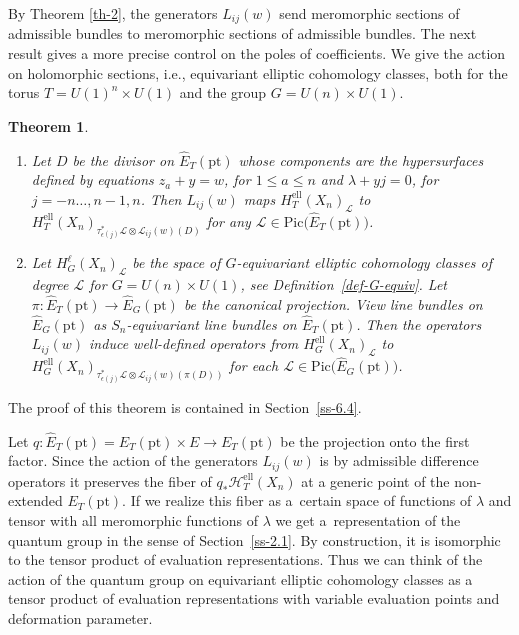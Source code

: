 \documentclass[10pt,a4paper]{amsart}
\numberwithin{equation}{section}
\newtheorem{Theorem}{Theorem}[section]
\begin{document}
By Theorem \ref{th-2}, the generators $L_{ij}(w)$ send meromorphic sections of admissible bundles to meromorphic sections of admissible bundles. The next result gives a more precise control on the poles of coefficients. We give the action on holomorphic sections, i.e., equivariant elliptic cohomology classes, both for the torus $T=U(1)^n\times U(1)$ and the group $G=U(n)\times U(1)$.

\begin{Theorem}\label{th-3}\quad
\begin{enumerate}\itemsep=0pt
\item[$(i)$] Let $D$ be the divisor on $\hat E_T(\mathrm{pt})$ whose components are the hypersurfaces defined by equations $z_a+y=w$, for $1\leq a\leq n$ and $\lambda+yj=0$, for $j=-n\dots,n-1,n$. Then $L_{ij}(w)$ maps $H^{\mathrm{ell}}_T(X_n)_{\mathcal L}$ to $H^{\mathrm{ell}}_T(X_n)_{\tau_{\epsilon(j)}^*\mathcal L\otimes \mathcal L_{ij}(w)(D)}$ for any $\mathcal L\in\mathrm{Pic}\big(\hat E_T(\mathrm{pt})\big)$.
\item[$(ii)$] Let $H^{\ell}_G(X_n)_{\mathcal L}$ be the space of $G$-equivariant elliptic cohomology classes of degree $\mathcal L$ for $G=U(n)\times U(1)$, see Definition~{\rm \ref{def-G-equiv}}. Let $\pi\colon \hat E_T(\mathrm{pt})\to \hat E_G(\mathrm{pt})$ be the canonical projection. View line bundles on $\hat E_G(\mathrm{pt})$ as $S_n$-equivariant line bundles on $\hat E_T(\mathrm{pt})$. Then the opera\-tors~$L_{ij}(w)$ induce well-defined operators from $H^{\mathrm{ell}}_G(X_n)_{\mathcal L}$ to $H^{\mathrm{ell}}_G(X_n)_{\tau_{\epsilon(j)}^*\mathcal L\otimes \mathcal L_{ij}(w)(\pi(D))}$ for each $\mathcal L\in\mathrm{Pic}\big(\hat E_G(\mathrm{pt})\big)$.
\end{enumerate}
\end{Theorem}
The proof of this theorem is contained in Section~\ref{ss-6.4}.
\begin{Remark} Let $q\colon\hat E_T(\mathrm{pt})=E_T(\mathrm{pt})\times E\to E_T(\mathrm{pt})$ be the projection onto the first factor. Since the action of the generators $L_{ij}(w)$ is by admissible difference operators it preserves the fiber of $q_*\mathcal H_T^{\mathrm{ell}}(X_n)$ at a generic point of the non-extended $E_T(\mathrm{pt})$. If we realize this fiber as a~certain space of functions of $\lambda$ and tensor with all meromorphic functions of $\lambda$ we get a~representation of the quantum group in the sense of Section~\ref{ss-2.1}. By construction, it is isomorphic to the tensor product of evaluation representations. Thus we can think of the action of the quantum group on equivariant elliptic cohomology classes as a tensor product of evaluation representations with variable evaluation points and deformation parameter.
\end{Remark}
\end{document}
